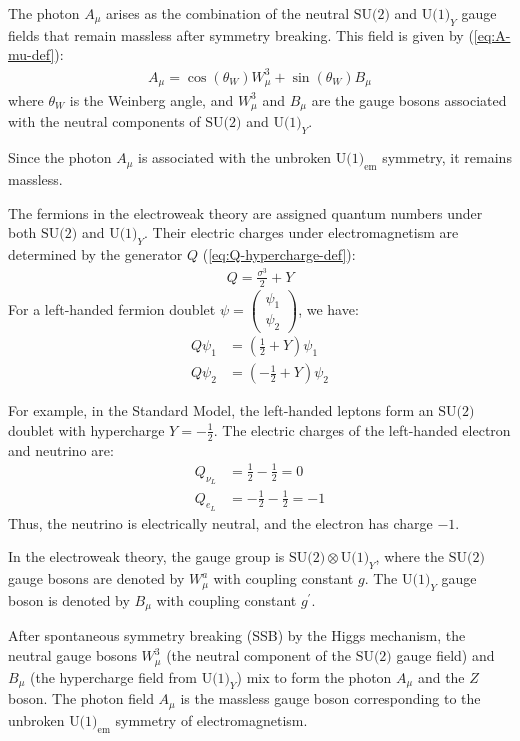 The photon $A_\mu$ arises as the combination of the neutral $\text{SU(2)}$ and $\text{U(1)}_Y$ gauge fields that remain massless after symmetry breaking. This field is given by (\ref{eq:A-mu-def}):
\begin{align*}
    A_\mu = \cos(\theta_W) W_\mu^3 + \sin(\theta_W) B_\mu
\end{align*}
where $\theta_W$ is the Weinberg angle, and $W_\mu^3$ and $B_\mu$ are the gauge bosons associated with the neutral components of $\text{SU(2)}$ and $\text{U(1)}_Y$.

Since the photon $A_\mu$ is associated with the unbroken $\text{U(1)}_{\text{em}}$ symmetry, it remains massless.

The fermions in the electroweak theory are assigned quantum numbers under both $\text{SU(2)}$ and $\text{U(1)}_Y$. Their electric charges under electromagnetism are determined by the generator $Q$ (\ref{eq:Q-hypercharge-def}):
\begin{align*}
    Q = \frac{\sigma^3}{2} + Y
\end{align*}
For a left-handed fermion doublet $\psi = \begin{pmatrix} \psi_1 \\ \psi_2 \end{pmatrix}$, we have:
\begin{align}
    Q \psi_1 &= \left( \frac{1}{2} + Y \right) \psi_1 \\
    Q \psi_2 &= \left( -\frac{1}{2} + Y \right) \psi_2
\end{align}

For example, in the Standard Model, the left-handed leptons form an $\text{SU(2)}$ doublet with hypercharge $\displaystyle Y = -\frac{1}{2}$. The electric charges of the left-handed electron and neutrino are:
\begin{align}
    Q_{\nu_L} &= \frac{1}{2} - \frac{1}{2} = 0 \\
    Q_{e_L} &= -\frac{1}{2} - \frac{1}{2} = -1
\end{align}
Thus, the neutrino is electrically neutral, and the electron has charge $-1$.

In the electroweak theory, the gauge group is $\text{SU(2)} \otimes \text{U(1)}_Y$, where the $\text{SU(2)}$ gauge bosons are denoted by $W_\mu^a$ with coupling constant $g$. The $\text{U(1)}_Y$ gauge boson is denoted by $B_\mu$ with coupling constant $g^\prime $.

After spontaneous symmetry breaking (SSB) by the Higgs mechanism, the neutral gauge bosons $W_\mu^3$ (the neutral component of the $\text{SU(2)}$ gauge field) and $B_\mu$ (the hypercharge field from $\text{U(1)}_Y$) mix to form the photon $A_\mu$ and the $Z$ boson. The photon field $A_\mu$ is the massless gauge boson corresponding to the unbroken $\text{U(1)}_{\text{em}}$ symmetry of electromagnetism.

